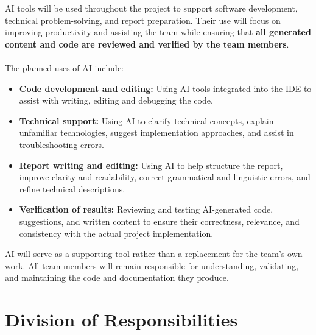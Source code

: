 \documentclass[11pt]{article}
\begin{document}
AI tools will be used throughout the project to support software development, technical problem-solving, and report preparation. Their use will focus on improving productivity and assisting the team while ensuring that \textbf{all generated content and code are reviewed and verified by the team members}. \\ \\
The planned uses of AI include:
\begin{itemize}
    \item \textbf{Code development and editing:} Using AI tools integrated into the IDE to assist with writing, editing and debugging the code.
    \item \textbf{Technical support:} Using AI to clarify technical concepts, explain unfamiliar technologies, suggest implementation approaches, and assist in troubleshooting errors.
    \item \textbf{Report writing and editing:} Using AI to help structure the report, improve clarity and readability, correct grammatical and linguistic errors, and refine technical descriptions.
    \item \textbf{Verification of results:} Reviewing and testing AI-generated code, suggestions, and written content to ensure their correctness, relevance, and consistency with the actual project implementation.
\end{itemize}
AI will serve as a supporting tool rather than a replacement for the team's own work. All team members will remain responsible for understanding, validating, and maintaining the code and documentation they produce.

\section{Division of Responsibilities}
\end{document}
